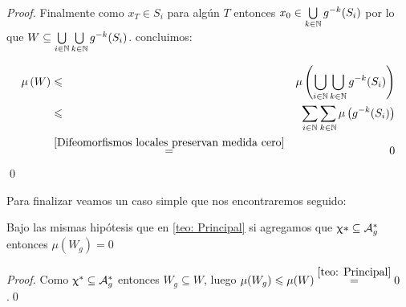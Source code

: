 \begin{proof}
	Finalmente como $x_{T} \in S_i$ para alg\'un $T$ entonces $x_0 \in \Bigcup{k \in \N}{g^{-k}(S_i)}$ por lo que $W \subseteq \Bigcup{i \in \N}{\Bigcup{k \in \N}{g^{-k}(S_i)}}$. concluimos:
	
	\begin{equation*}
	\begin{aligned}
	\mu \left(W\right) & \le & \mu \left(\Bigcup{i \in \N}{\Bigcup{k \in \N}{g^{-k}(S_i)}} \right) \\
	& \le & \Bigsum{i \in \N}{\Bigsum{k \in \N}{\mu \left(g^{-k}(S_i)\right)}} \\
	& \stackrel{\ref{Difeomorfismos locales preservan medida cero}}{=} & 0
	\end{aligned}
	\end{equation*}\qed
	
	
\end{proof}

Para finalizar veamos un caso simple que nos encontraremos seguido:

\begin{corollary}
	\label{coro: Resultado principal}
	Bajo las mismas hip\'otesis que en \ref{teo: Principal} si agregamos que $\mani* \subseteq \puntosfijos$ entonces $\mu(W_g) =0$
\end{corollary}

\begin{proof}
	Como $\mani^* \subseteq \puntosfijos$ entonces $W_g \subseteq W$, luego $\mu(W_g) \le \mu (W) \stackrel{\ref{teo: Principal}}{=} 0$.\qed
\end{proof}